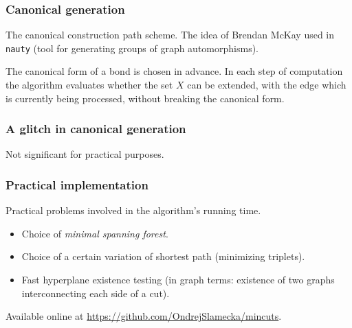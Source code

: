 \documentclass[10pt]{beamer}
\begin{document}
\begin{frame}
	\frametitle{Canonical generation}

	The canonical construction path scheme. The idea of Brendan McKay used in {\tt nauty} (tool for generating groups of graph automorphisms).

	\bigskip

	The canonical form of a bond is chosen in advance. In each step of computation the algorithm evaluates whether the set $X$ can be extended, with the edge which is currently being processed, without breaking the canonical form.

\end{frame}

\begin{frame}
	\frametitle{A glitch in canonical generation}

	

	\bigskip

	Not significant for practical purposes.

\end{frame}

\begin{frame}
	\frametitle{Practical implementation}

	Practical problems involved in the algorithm's running time.

	\begin{itemize}
		\item Choice of \textit{minimal spanning forest}.
		\item Choice of a certain variation of shortest path (minimizing triplets).
		\item Fast hyperplane existence testing (in graph terms: existence of two graphs interconnecting each side of a cut).
	\end{itemize}

	\bigskip
	Available online at \href{https://github.com/OndrejSlamecka/mincuts}{\url{https://github.com/OndrejSlamecka/mincuts}}.

\end{frame}
\end{document}
